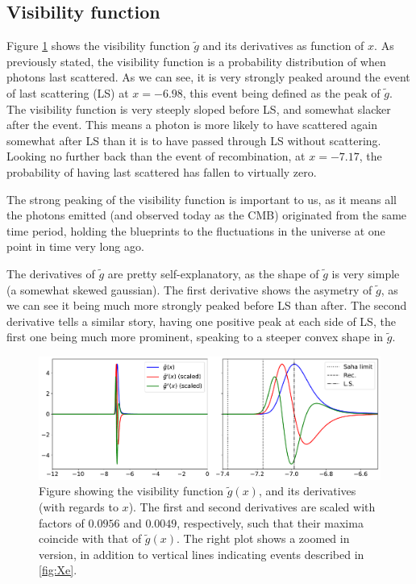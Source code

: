 \documentclass[10pt, a4paper]{article}
\begin{document}
\subsection{Visibility function}\label{sec:results:g_tilde}
Figure \ref{fig:g_tilde} shows the visibility function $\tilde{g}$ and its derivatives as function of $x$. As previously stated, the visibility function is a probability distribution of when photons last scattered. As we can see, it is very strongly peaked around the event of last scattering (LS) at $x = -6.98$, this event being defined as the peak of $\tilde{g}$. The visibility function is very steeply sloped before LS, and somewhat slacker after the event. This means a photon is more likely to have scattered again somewhat after LS than it is to have passed through LS without scattering. Looking no further back than the event of recombination, at $x = -7.17$, the probability of having last scattered has fallen to virtually zero.

The strong peaking of the visibility function is important to us, as it means all the photons emitted (and observed today as the CMB) originated from the same time period, holding the blueprints to the fluctuations in the universe at one point in time very long ago.

The derivatives of $\tilde{g}$ are pretty self-explanatory, as the shape of $\tilde{g}$ is very simple (a somewhat skewed gaussian). The first derivative shows the asymetry of $\tilde{g}$, as we can see it being much more strongly peaked before LS than after. The second derivative tells a similar story, having one positive peak at each side of LS, the first one being much more prominent, speaking to a steeper convex shape in $\tilde{g}$.


\begin{figure}[H]
    \centering
    \includegraphics[scale=0.5]{../m2_figs/g_tilde.pdf}
    \caption{Figure showing the visibility function $\tilde{g}(x)$, and its derivatives (with regards to $x$). The first and second derivatives are scaled with factors of $0.0956$ and $0.0049$, respectively, such that their maxima coincide with that of $\tilde{g}(x)$. The right plot shows a zoomed in version, in addition to vertical lines indicating events described in \ref{fig:Xe}.}
    \label{fig:g_tilde}
\end{figure}
\end{document}

